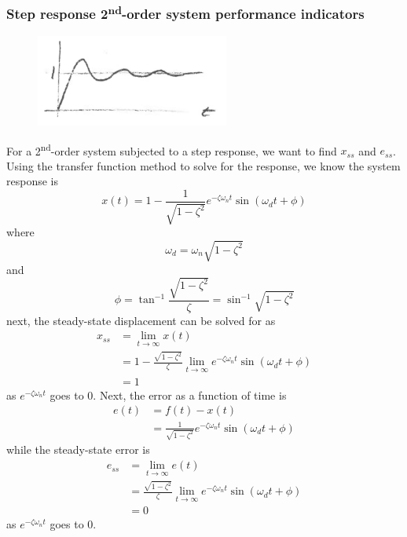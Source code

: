 \documentclass[12pt,letter]{article}
\numberwithin{ex}{section} %
\numberwithin{re}{section} %
\numberwithin{equation}{section}	%
\begin{document}
\subsubsection{Step response 2\textsuperscript{nd}-order system performance indicators}


\begin{figure}[H]
	\centering
	\includegraphics[width=2.5in]{../figures/step_response_2nd_order_with_steady_state_error}
\end{figure}

For a 2\textsuperscript{nd}-order system subjected to a step response, we want to find $x_{ss}$ and $e_{ss}$. Using the transfer function method to solve for the response, we know the system response is
\begin{equation}
x(t) = 1 - \frac{1}{\sqrt{1-\zeta^2}} e^{-\zeta \omega_n t} \sin (\omega_d t + \phi)
\end{equation}
where 
\begin{equation}
\omega_d = \omega_n \sqrt{1-\zeta^2}
\end{equation}
and 
\begin{equation}
\phi = \tan^{-1} \frac{\sqrt{1-\zeta^2}}{\zeta} = \sin^{-1} \sqrt{1-\zeta^2}
\end{equation}
next, the steady-state displacement can be solved for as
\begin{align}
x_{ss} &= \lim\limits_{t \rightarrow \infty} x(t)\\
&= 1 - \frac{\sqrt{1-\zeta^2}}{\zeta}  \lim\limits_{t \rightarrow \infty}  e^{-\zeta \omega_n t} \sin (\omega_d t + \phi) \nonumber \\
&=  1 \nonumber
\end{align}
as $e^{-\zeta \omega_n t} $ goes to 0. Next, the error as a function of time is 
\begin{align}
e(t) &= f(t) - x(t) \\
&= \frac{1}{\sqrt{1-\zeta^2}} e^{-\zeta \omega_n t} \sin (\omega_d t + \phi) \nonumber
\end{align}
while the steady-state error is
\begin{align}
e_{ss} &= \lim\limits_{t \rightarrow \infty}e(t) \\
&=  \frac{\sqrt{1-\zeta^2}}{\zeta}  \lim\limits_{t \rightarrow \infty}  e^{-\zeta \omega_n t} \sin (\omega_d t + \phi) \nonumber \\
&= 0 \nonumber
\end{align}
as $e^{-\zeta \omega_n t} $ goes to 0.
\end{document}
